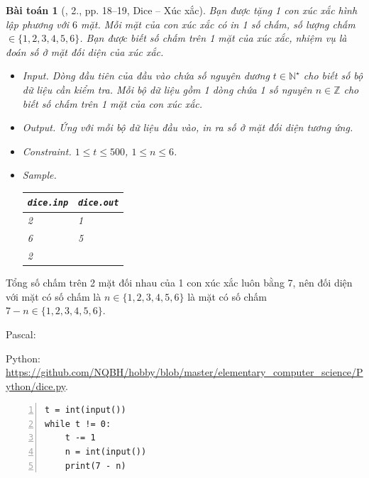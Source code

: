 \documentclass{article}
\newtheorem{baitoan}{Bài toán}
\begin{document}
\begin{baitoan}[\cite{Duc_200_BT_Python}, 2., pp. 18--19, Dice -- Xúc xắc]
	Bạn được tặng 1 con xúc xắc hình lập phương với $6$ mặt. Mỗi mặt của con xúc xắc có in 1 số chấm, số lượng chấm $\in\{1,2,3,4,5,6\}$. Bạn được biết số chấm trên 1 mặt của xúc xắc, nhiệm vụ là đoán số ở mặt đối diện của xúc xắc.
	\begin{itemize}
		\item {\sf Input.} Dòng đầu tiên của đầu vào chứa số nguyên dương $t\in\mathbb{N}^\star$ cho biết số bộ dữ liệu cần kiểm tra. Mỗi bộ dữ liệu gồm 1 dòng chứa 1 số nguyên $n\in\mathbb{Z}$ cho biết số chấm trên 1 mặt của con xúc xắc.
		\item {\sf Output.} Ứng với mỗi bộ dữ liệu đầu vào, in ra số ở mặt đối diện tương ứng.
		\item {\sf Constraint.} $1\le t\le500$, $1\le n\le6$.
		\item {\sf Sample.}
		\begin{table}[H]
			\centering
			\begin{tabular}{|l|l|}
				\hline
				{\tt dice.inp} & {\tt dice.out} \\
				\hline
				2 & 1 \\
				6 & 5 \\
				2 &  \\
				\hline
			\end{tabular}
		\end{table}
	\end{itemize}
\end{baitoan}
Tổng số chấm trên 2 mặt đối nhau của 1 con xúc xắc luôn bằng 7, nên đối diện với mặt có số chấm là $n\in\{1,2,3,4,5,6\}$ là mặt có số chấm $7 - n\in\{1,2,3,4,5,6\}$.

Pascal:

Python: \url{https://github.com/NQBH/hobby/blob/master/elementary_computer_science/Python/dice.py}.
\begin{Verbatim}[numbers=left,xleftmargin=5mm]
t = int(input())
while t != 0:
    t -= 1
    n = int(input())
    print(7 - n)
\end{Verbatim}
\end{document}
